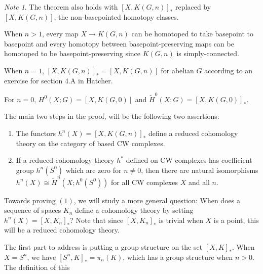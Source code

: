 \documentclass[reqno]{amsart}
\theoremstyle{definition}
\theoremstyle{remark}
\newtheorem*{note}{Note}
\begin{document}
     \begin{note}
         The theorem also holds with
         $\left[ X,K(G,n) \right]_*$ replaced by
         $\left[ X, K(G,n) \right] $, the non-basepointed
         homotopy classes. 

         When $n>1$, every map $X \to K(G,n)$ can be
         homotoped to take basepoint to basepoint and
         every homotopy between basepoint-preserving maps can be
         homotoped to be basepoint-preserving since 
         $K(G,n)$ is simply-connected. 

         When $n=1$, 
         $\left[ X,K(G,n) \right]_* =
         \left[ X,K(G,n) \right] $ for abelian $G$ according
         to an exercise for section
         4.A in Hatcher.
         
         For  $n=0$, 
         $H^{0}(X;G) = 
         \left[ X,K(G,0) \right] $ and
         $\tilde{H}^{0}(X;G)
         = \left[ X,K(G,0) \right]_*$.
     \end{note}

     The main two steps in the proof, will be the
     following two assertions:
     \begin{enumerate}
         \item The functors
             $h^{n}(X) = 
             \left[ X,K(G,n) \right]_*$ define a
             reduced cohomology theory on the
             category of based CW complexes.
         \item If a reduced cohomology theory 
             $h^{*}$ defined on CW complexes has
             coefficient group $h^{n}(S^{0})$ which
             are zero for $n\neq 0$, then there
             are natural isomorphisms
             $h^{n}(X) \cong
             \tilde{H}^{n}(X;h^{0}(S^{0}))$ for all
             CW complexes $X$ and all $n$.
     \end{enumerate}

     Towards proving $(1)$, we will study a more
     general question: When does a sequence
     of spaces $K_n$ define a cohomology theory
     by setting $h^{n}(X) = 
     \left[ X,K_n \right]_*$? Note that
     since $\left[ X,K_n \right]_*$ is trivial when
     $X$ is a point, this will be a reduced cohomology theory.\\
     \linebreak
     
     The first part to address is putting a group
     structure on the set $\left[ X,K \right]_*$.
     When $X = S^{n}$, we have $
     \left[ S^{n},K \right]_* = 
     \pi_n (K)$, which has a group structure when
     $n>0$. The definition of this 
\end{document}
